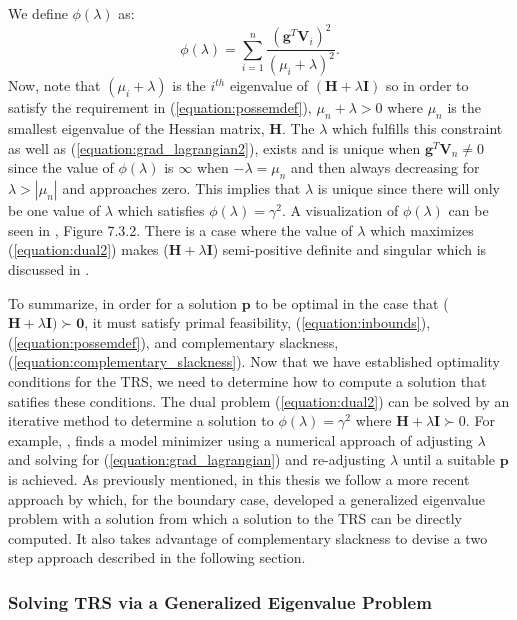 \documentclass[letterpaper,12pt,titlepage,oneside,final]{book}
\begin{document}
	We define $\phi(\lambda)$ as:
	\begin{equation}
	\phi(\lambda) = \sum_{i=1}^{n}{\frac{(\mathbf{g}^{T}\mathbf{V}_{i})^{2}}{(\mu_{i} + \lambda)^{2}}}.
	\label{phi}
	\end{equation}
	Now, note that $(\mu_{i} + \lambda)$ is the $i^{th}$ eigenvalue of $(\mathbf{H} + \lambda\mathbf{I})$ so in order to satisfy the requirement in (\ref{equation:possemdef}), $\mu_{n} + \lambda > 0$ where $\mu_{n}$ is the smallest eigenvalue of the Hessian matrix, $\mathbf{H}$. The $\lambda$ which fulfills this constraint as well as (\ref{equation:grad_lagrangian2}), exists and is unique when $\mathbf{g}^{T}\mathbf{V}_{n}\neq0$ since the value of $\phi(\lambda)$ is $\infty$ when $-\lambda = \mu_{n}$ and then always decreasing for $\lambda > |\mu_{n}|$ and approaches zero. This implies that $\lambda$ is unique since there will only be one value of $\lambda$ which satisfies $\phi(\lambda) = \gamma^{2}$. A visualization of $\phi(\lambda)$ can be seen in \cite{TRM.book}, Figure 7.3.2. There is a case where the value of $\lambda$ which maximizes (\ref{equation:dual2}) makes ($\mathbf{H}+\lambda\mathbf{I}$) semi-positive definite and singular which is discussed in \cite{adachi.paper}. 

	To summarize, in order for a solution $\mathbf{p}$ to be optimal in the case that ($\mathbf{H} + \lambda\mathbf{I}) \succ \mathbf{0}$, it must satisfy primal feasibility, (\ref{equation:inbounds}), (\ref{equation:possemdef}), and complementary slackness, (\ref{equation:complementary_slackness}). Now that we have established optimality conditions for the TRS, we need to determine how to compute a solution that satifies these conditions. The dual problem (\ref{equation:dual2}) can be solved by an iterative method to determine a solution to $\phi(\lambda) = \gamma^{2}$ where $\mathbf{H} + \lambda \mathbf{I} \succ 0$. For example, \cite{TRM.book}, finds a model minimizer using a numerical approach of adjusting $\lambda$ and solving for (\ref{equation:grad_lagrangian}) and re-adjusting $\lambda$ until a suitable $\mathbf{p}$ is achieved. As previously mentioned, in this thesis we follow a more recent approach by \cite{adachi.paper} which, for the boundary case, developed a generalized eigenvalue problem with a solution from which a solution to the TRS can be directly computed. It also takes advantage of complementary slackness to devise a two step approach described in the following section. 
	
	\subsubsection{Solving TRS via a Generalized Eigenvalue Problem}
	
\end{document}
